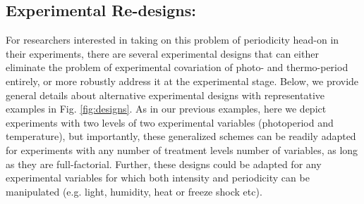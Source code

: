 \documentclass[11pt]{article}
\begin{document}
\subsection*{Experimental Re-designs:}
For researchers interested in taking on this problem of periodicity head-on in their experiments, there are several experimental designs that can either eliminate the problem of experimental covariation of photo- and thermo-period entirely, or more robustly address it at the experimental stage. Below, we provide general details about alternative experimental designs with representative examples in Fig. \ref{fig:designs}. As in our previous examples, here we depict experiments with two levels of two experimental variables (photoperiod and temperature), but importantly, these generalized schemes can be readily adapted for experiments with any number of treatment levels number of variables, as long as they are full-factorial. Further, these designs could be adapted for any experimental variables for which both intensity and periodicity can be manipulated (e.g. light, humidity, heat or freeze shock etc).
\end{document}
